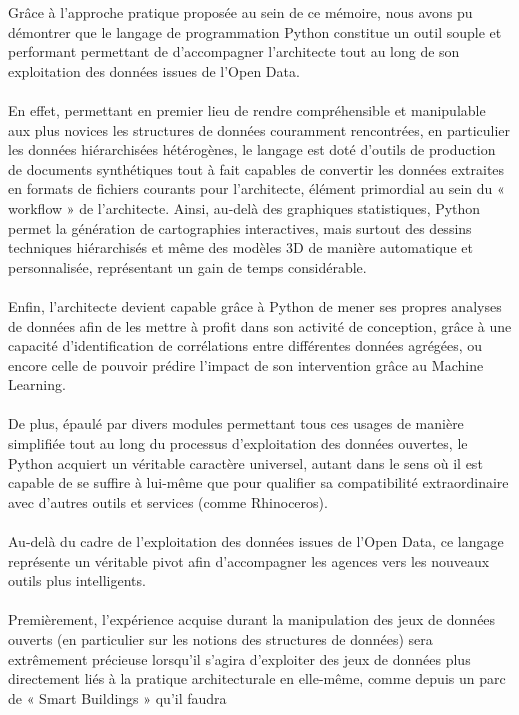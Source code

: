 \documentclass[
  11pt,
  french,
]{article}
\begin{document}
Grâce à l'approche pratique proposée au sein de ce mémoire, nous avons
pu démontrer que le langage de programmation Python constitue un outil
souple et performant permettant de d'accompagner l'architecte tout au
long de son exploitation des données issues de l'Open Data.\\
~\\
En effet, permettant en premier lieu de rendre compréhensible et
manipulable aux plus novices les structures de données couramment
rencontrées, en particulier les données hiérarchisées hétérogènes, le
langage est doté d'outils de production de documents synthétiques tout à
fait capables de convertir les données extraites en formats de fichiers
courants pour l'architecte, élément primordial au sein du « workflow »
de l'architecte. Ainsi, au-delà des graphiques statistiques, Python
permet la génération de cartographies interactives, mais surtout des
dessins techniques hiérarchisés et même des modèles 3D de manière
automatique et personnalisée, représentant un gain de temps
considérable.\\
~\\
Enfin, l'architecte devient capable grâce à Python de mener ses propres
analyses de données afin de les mettre à profit dans son activité de
conception, grâce à une capacité d'identification de corrélations entre
différentes données agrégées, ou encore celle de pouvoir prédire
l'impact de son intervention grâce au Machine Learning.\\
~\\
De plus, épaulé par divers modules permettant tous ces usages de manière
simplifiée tout au long du processus d'exploitation des données
ouvertes, le Python acquiert un véritable caractère universel, autant
dans le sens où il est capable de se suffire à lui-même que pour
qualifier sa compatibilité extraordinaire avec d'autres outils et
services (comme Rhinoceros).\\
~\\
Au-delà du cadre de l'exploitation des données issues de l'Open Data, ce
langage représente un véritable pivot afin d'accompagner les agences
vers les nouveaux outils plus intelligents.\\
~\\
Premièrement, l'expérience acquise durant la manipulation des jeux de
données ouverts (en particulier sur les notions des structures de
données) sera extrêmement précieuse lorsqu'il s'agira d'exploiter des
jeux de données plus directement liés à la pratique architecturale en
elle-même, comme depuis un parc de « Smart Buildings » qu'il faudra
\end{document}
